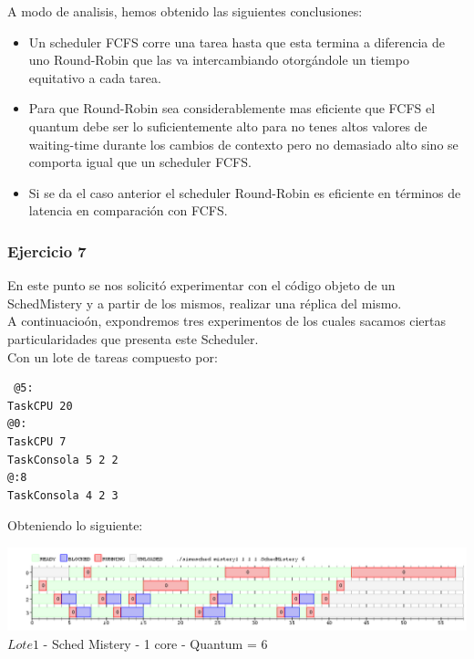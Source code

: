 \indent A modo de analisis, hemos obtenido las siguientes conclusiones:\\


\begin{itemize}
 \item Un scheduler FCFS corre una tarea hasta que esta termina a diferencia de uno Round-Robin 
que las va intercambiando otorg\'{a}ndole un tiempo equitativo a cada tarea.
\item Para que Round-Robin sea considerablemente mas eficiente que FCFS el quantum debe ser 
lo suficientemente alto para no tenes altos valores de waiting-time durante los cambios de 
contexto pero no demasiado alto sino se comporta igual que un scheduler FCFS.
\item Si se da el caso anterior el scheduler Round-Robin es eficiente en t\'{e}rminos 
de latencia en comparaci\'{o}n con FCFS.
\end{itemize}


\subsubsection[Resolución Ejercicio 5]{Ejercicio 7}

\indent En este punto se nos solicit\'{o} experimentar con el c\'{o}digo objeto de un 
SchedMistery y a partir de los mismos, realizar una r\'{e}plica del mismo.\\

A continuacio\'{o}n, expondremos tres experimentos de los cuales sacamos ciertas particularidades que presenta este Scheduler.\\

Con un lote de tareas compuesto por:\\

\begin{verbatim}
 @5:
TaskCPU 20
@0:
TaskCPU 7
TaskConsola 5 2 2
@:8
TaskConsola 4 2 3
\end{verbatim}

Obteniendo lo siguiente:
\begin{center}
    	\includegraphics[width=450pt]{./Test/ej7_1.png}
	{$Lote 1$ - Sched Mistery - 1 core - Quantum = 6}	
 \end{center}
 
